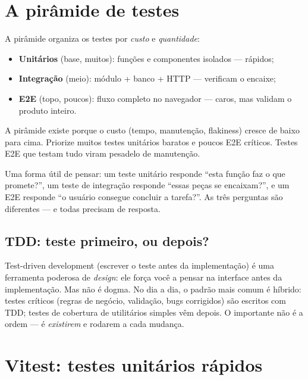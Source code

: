 \section{A pirâmide de testes}

A pirâmide organiza os testes por \emph{custo} e \emph{quantidade}:

\begin{itemize}[leftmargin=*, itemsep=0.4em]
  \item \textbf{Unitários} (base, muitos): funções e componentes isolados — rápidos;
  \item \textbf{Integração} (meio): módulo + banco + HTTP — verificam o encaixe;
  \item \textbf{E2E} (topo, poucos): fluxo completo no navegador — caros, mas validam o produto inteiro.
\end{itemize}

\begin{caixaconceito}
A pirâmide existe porque o custo (tempo, manutenção, flakiness) cresce de
baixo para cima. Priorize muitos testes unitários baratos e poucos E2E
críticos. Testes E2E que testam tudo viram pesadelo de manutenção.
\end{caixaconceito}

\begin{caixadica}
Uma forma útil de pensar: um teste unitário responde ``esta função faz o que
promete?'', um teste de integração responde ``essas peças se encaixam?'', e um
E2E responde ``o usuário consegue concluir a tarefa?''. As três perguntas são
diferentes — e todas precisam de resposta.
\end{caixadica}

\subsection{TDD: teste primeiro, ou depois?}

Test-driven development (escrever o teste antes da implementação) é uma
ferramenta poderosa de \emph{design}: ele força você a pensar na interface
antes da implementação. Mas não é dogma. No dia a dia, o padrão mais comum é
híbrido: testes críticos (regras de negócio, validação, bugs corrigidos) são
escritos com TDD; testes de cobertura de utilitários simples vêm depois. O
importante não é a ordem — é \emph{existirem} e rodarem a cada mudança.

\section{Vitest: testes unitários rápidos}

